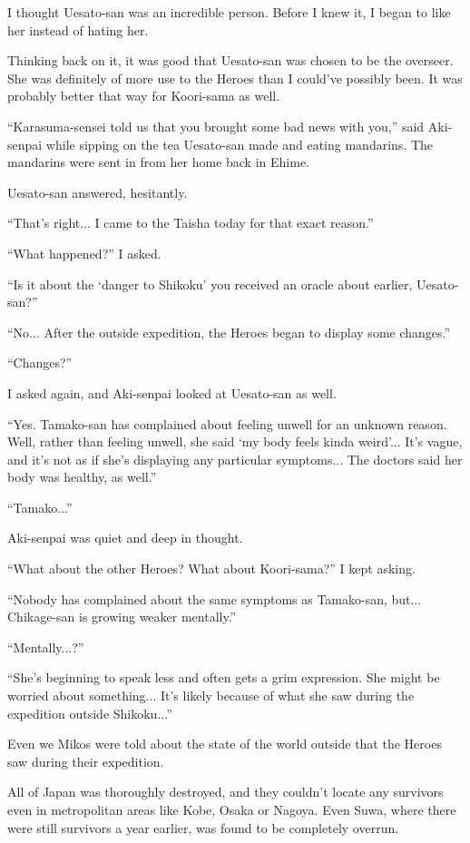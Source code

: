 I thought Uesato-san was an incredible person. Before I knew it, I began to like her instead of hating her.

Thinking back on it, it was good that Uesato-san was chosen to be the overseer. She was definitely of more use to the Heroes than I could've possibly been. It was probably better that way for Koori-sama as well.

``Karasuma-sensei told us that you brought some bad news with you,'' said Aki-senpai while sipping on the tea Uesato-san made and eating mandarins. The mandarins were sent in from her home back in Ehime.

Uesato-san answered, hesitantly.

``That's right... I came to the Taisha today for that exact reason.''

``What happened?'' I asked.

``Is it about the `danger to Shikoku' you received an oracle about earlier, Uesato-san?''

``No... After the outside expedition, the Heroes began to display some changes.''

``Changes?''

I asked again, and Aki-senpai looked at Uesato-san as well.

``Yes. Tamako-san has complained about feeling unwell for an unknown reason. Well, rather than feeling unwell, she said `my body feels kinda weird'... It's vague, and it's not as if she's displaying any particular symptoms... The doctors said her body was healthy, as well.''

``Tamako...''

Aki-senpai was quiet and deep in thought.

``What about the other Heroes? What about Koori-sama?'' I kept asking.

``Nobody has complained about the same symptoms as Tamako-san, but... Chikage-san is growing weaker mentally.''

``Mentally...?''

``She's beginning to speak less and often gets a grim expression. She might be worried about something... It's likely because of what she saw during the expedition outside Shikoku...''

Even we Mikos were told about the state of the world outside that the Heroes saw during their expedition.

All of Japan was thoroughly destroyed, and they couldn't locate any survivors even in metropolitan areas like Kobe, Osaka or Nagoya. Even Suwa, where there were still survivors a year earlier, was found to be completely overrun.

